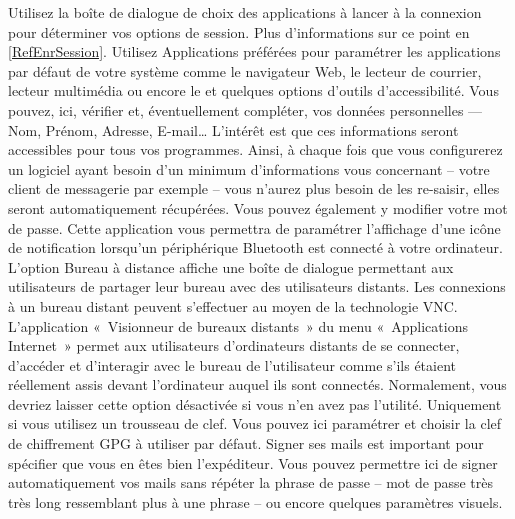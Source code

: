 Utilisez la boîte de dialogue de choix des applications à lancer à la connexion pour déterminer vos options de session. Plus d'informations sur ce point en \ref{RefEnrSession}.
Utilisez Applications préférées pour paramétrer les applications par défaut de votre système comme le navigateur Web, le lecteur de courrier, lecteur multimédia ou encore le  et quelques options d'outils d'accessibilité.
Vous pouvez, ici, vérifier et, éventuellement compléter, vos données personnelles --- Nom, Prénom, Adresse, E-mail\ldots{} L'intérêt est que ces informations seront accessibles pour tous vos programmes. Ainsi, à chaque fois que vous configurerez un logiciel ayant besoin d'un minimum d'informations vous concernant -- votre client de messagerie par exemple -- vous n'aurez plus besoin de les re-saisir, elles seront automatiquement récupérées.  Vous pouvez également y modifier votre mot de passe.
Cette application vous permettra de paramétrer l'affichage d'une icône de notification lorsqu'un périphérique Bluetooth est connecté à votre ordinateur.
L'option Bureau à distance affiche une boîte de dialogue permettant aux utilisateurs de partager leur bureau avec des utilisateurs distants. Les connexions à un bureau distant peuvent s'effectuer au moyen de la technologie VNC. L'application «~Visionneur de bureaux distants~» du menu «~Applications \FlecheDroite Internet~» permet aux utilisateurs d'ordinateurs distants de se connecter, d'accéder et d'interagir avec le bureau de l'utilisateur comme s'ils étaient réellement assis devant l'ordinateur auquel ils sont connectés. Normalement, vous devriez laisser cette option désactivée si vous n'en avez pas l'utilité.
Uniquement si vous utilisez un trousseau de clef. Vous pouvez ici paramétrer et choisir la clef de chiffrement GPG à utiliser par défaut. Signer ses mails est important pour spécifier que vous en êtes bien l'expéditeur. Vous pouvez permettre ici de signer automatiquement vos mails sans répéter la phrase de passe -- mot de passe très très long ressemblant plus à une phrase -- ou encore quelques paramètres visuels.

